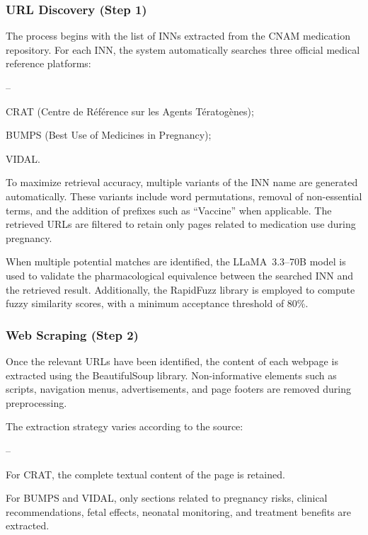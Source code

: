 \subsubsection{URL Discovery (Step 1)}

The process begins with the list of INNs extracted from the CNAM medication repository. For each INN, the system automatically searches three official medical reference platforms:

\begin{list}{--}{}
 \setlength\itemsep{-0.5em}
    \item CRAT (Centre de Référence sur les Agents Tératogènes);
    \item BUMPS (Best Use of Medicines in Pregnancy);
    \item VIDAL.
\end{list}

To maximize retrieval accuracy, multiple variants of the INN name are generated automatically. These variants include word permutations, removal of non-essential terms, and the addition of prefixes such as ``Vaccine'' when applicable. The retrieved URLs are filtered to retain only pages related to medication use during pregnancy.

When multiple potential matches are identified, the LLaMA~3.3--70B \cite{llama33} model is used to validate the pharmacological equivalence between the searched INN and the retrieved result. Additionally, the RapidFuzz library is employed to compute fuzzy similarity scores, with a minimum acceptance threshold of 80\%.

\subsubsection{Web Scraping  (Step 2)}

Once the relevant URLs have been identified, the content of each webpage is extracted using the BeautifulSoup library. Non-informative elements such as scripts, navigation menus, advertisements, and page footers are removed during preprocessing.

The extraction strategy varies according to the source:

\begin{list}{--}{}
 \setlength\itemsep{-0.5em}
    \item For CRAT, the complete textual content of the page is retained.
    \item For BUMPS and VIDAL, only sections related to pregnancy risks, clinical recommendations, fetal effects, neonatal monitoring, and treatment benefits are extracted.
\end{list}

